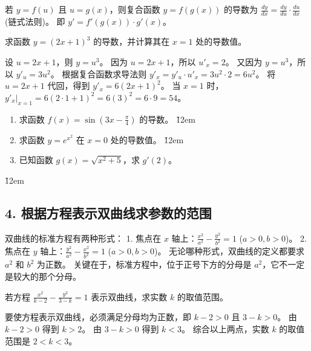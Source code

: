 \begin{theorem}
    若 $y = f(u)$ 且 $u = g(x)$，则复合函数 $y = f(g(x))$ 的导数为 $\frac{dy}{dx} = \frac{dy}{du} \cdot \frac{du}{dx}$ (链式法则)。
    即 $y' = f'(g(x)) \cdot g'(x)$。
\end{theorem}

\begin{example}
    求函数 $y = (2x + 1)^3$ 的导数，并计算其在 $x=1$ 处的导数值。
\end{example}
\begin{solution}
    设 $u = 2x+1$，则 $y = u^3$。
    因为 $u = 2x+1$，所以 $u'_x = 2$。
    又因为 $y = u^3$，所以 $y'_u = 3u^2$。
    根据复合函数求导法则 $y'_x = y'_u \cdot u'_x = 3u^2 \cdot 2 = 6u^2$。
    将 $u = 2x+1$ 代回，得到 $y'_x = 6(2x+1)^2$。
    当 $x=1$ 时，$y'_x|_{x=1} = 6(2 \cdot 1 + 1)^2 = 6(3)^2 = 6 \cdot 9 = 54$。
\end{solution}

\begin{problem}
\begin{enumerate}
    \item 求函数 $f(x) = \sin(3x - \frac{\pi}{4})$ 的导数。
          \v{12em}
    \item 求函数 $y = e^{x^2}$ 在 $x=0$ 处的导数值。
          \v{12em}
    \item 已知函数 $g(x) = \sqrt{x^2 + 5}$，求 $g'(2)$。
\end{enumerate}
\v{12em}
\end{problem}

\subsection*{4. 根据方程表示双曲线求参数的范围}
\begin{theorem}
    双曲线的标准方程有两种形式：
    1.  焦点在 $x$ 轴上：$\frac{x^2}{a^2} - \frac{y^2}{b^2} = 1$ ($a>0, b>0$)。
    2.  焦点在 $y$ 轴上：$\frac{y^2}{a^2} - \frac{x^2}{b^2} = 1$ ($a>0, b>0$)。
    无论哪种形式，双曲线的定义都要求 $a^2$ 和 $b^2$ 为正数。
    关键在于，标准方程中，位于正号下方的分母是 $a^2$，它不一定是较大的那个分母。
\end{theorem}

\begin{example}
    若方程 $\frac{x^2}{k-2} - \frac{y^2}{3-k} = 1$ 表示双曲线，求实数 $k$ 的取值范围。
\end{example}
\begin{solution}
    要使方程表示双曲线，必须满足分母均为正数，即 $k-2 > 0$ 且 $3-k > 0$。
    由 $k-2 > 0$ 得到 $k > 2$。
    由 $3-k > 0$ 得到 $k < 3$。
    综合以上两点，实数 $k$ 的取值范围是 $2 < k < 3$。
\end{solution}


